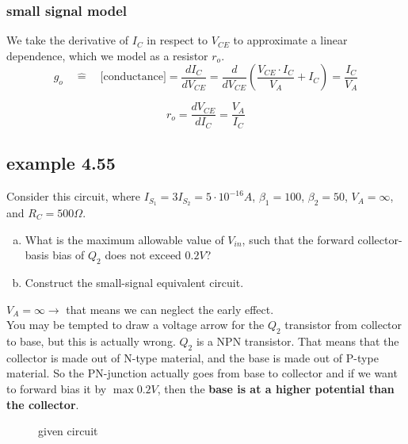 \documentclass[11ypt]{extarticle}
\begin{document}
\subsubsection{small signal model}

We take the derivative of $I_C$ in respect to $V_{CE}$ to approximate a linear dependence, which we model as a resistor $r_o$.
\begin{equation}
    g_o \quad \hat{=} \quad \text{[conductance]} = \frac{dI_C}{dV_{CE}} = \frac{d}{dV_{CE}} \left( \frac{V_{CE} \cdot I_C}{V_A} + I_C \right) = \frac{I_C}{V_A}
\end{equation}

\begin{equation}
    r_o = \frac{dV_{CE}}{dI_C} = \frac{V_A}{I_C}
\end{equation}

\subsection{example 4.55}

Consider this circuit, where $I_{S_1} = 3 I_{S_2} = 5 \cdot 10^{-16} A$, $\beta_1 = 100$, $\beta_2 = 50$, $V_A = \infty$, and $R_C = 500 \Omega$. 
\\

\begin{enumerate}[a.]
\item 
What is the maximum allowable value of $V_{in}$, such that the forward collector-basis bias of $Q_2$ does not exceed $0.2 V$?
\item
Construct the small-signal equivalent circuit.
\end{enumerate}

$V_A = \infty \to$ that means we can neglect the early effect.
\\
You may be tempted to draw a voltage arrow for the $Q_2$ transistor from collector to base, but this is actually wrong. $Q_2$ is a NPN transistor. That means that the collector is made out of N-type material, and the base is made out of P-type material. So the PN-junction actually goes from base to collector and if we want to forward bias it by $\max 0.2 V$, then the \textbf{base is at a higher potential than the collector}. 

\begin{figure}[H]{} 
    \centering
    
    \caption{given circuit}
\end{figure}
\end{document}
